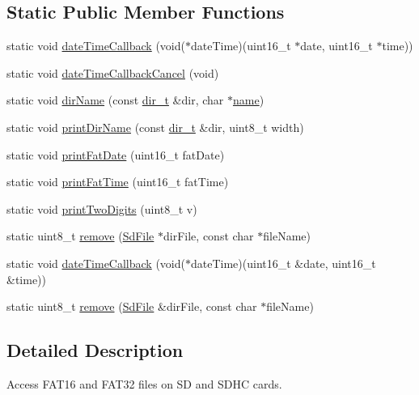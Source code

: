 \subsection*{Static Public Member Functions}
\begin{DoxyCompactItemize}
\item 
static void \hyperlink{class_sd_file_a2d78e6a8cedbf8ce545af68457b43bf1}{date\+Time\+Callback} (void($\ast$date\+Time)(uint16\+\_\+t $\ast$date, uint16\+\_\+t $\ast$time))
\item 
static void \hyperlink{class_sd_file_adaec83fdbd8473a8e336e27b8622f673}{date\+Time\+Callback\+Cancel} (void)
\item 
static void \hyperlink{class_sd_file_ad7bbb106aa4c96c795c88b33def677bc}{dir\+Name} (const \hyperlink{_fat_structs_8h_a803db59d4e16a0c54a647afc6a7954e3}{dir\+\_\+t} \&dir, char $\ast$\hyperlink{_fat_structs_8h_a30308c9b983377042fd2cc8900454fb1}{name})
\item 
static void \hyperlink{class_sd_file_a7267e3def5cba51149ff98baf5d3f2c8}{print\+Dir\+Name} (const \hyperlink{_fat_structs_8h_a803db59d4e16a0c54a647afc6a7954e3}{dir\+\_\+t} \&dir, uint8\+\_\+t width)
\item 
static void \hyperlink{class_sd_file_a77022a204f3e5148e78e1b7ae7b6865a}{print\+Fat\+Date} (uint16\+\_\+t fat\+Date)
\item 
static void \hyperlink{class_sd_file_ab981ea789ec76d1a44e4b3c8a84ccd35}{print\+Fat\+Time} (uint16\+\_\+t fat\+Time)
\item 
static void \hyperlink{class_sd_file_a0af47048953a2d1526db9336c39a8919}{print\+Two\+Digits} (uint8\+\_\+t v)
\item 
static uint8\+\_\+t \hyperlink{class_sd_file_ab932b7896dce90a29031f3a9039807a2}{remove} (\hyperlink{class_sd_file}{Sd\+File} $\ast$dir\+File, const char $\ast$file\+Name)
\item 
static void \hyperlink{class_sd_file_a88a9b32bfec07c8c5cfdf8a36b7faf26}{date\+Time\+Callback} (void($\ast$date\+Time)(uint16\+\_\+t \&date, uint16\+\_\+t \&time))
\item 
static uint8\+\_\+t \hyperlink{class_sd_file_aaea53aa58f7577dfafd0da3cb084f6d1}{remove} (\hyperlink{class_sd_file}{Sd\+File} \&dir\+File, const char $\ast$file\+Name)
\end{DoxyCompactItemize}


\subsection{Detailed Description}
Access F\+A\+T16 and F\+A\+T32 files on S\+D and S\+D\+H\+C cards. 


